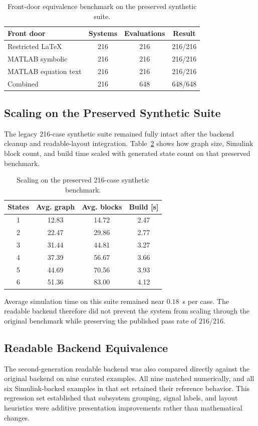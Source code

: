 \documentclass[colorlinks,upint,subscriptcorrection,varvw,balance,nofoot]{asmeconf}
\begin{document}
\begin{table}[t]
\caption{Front-door equivalence benchmark on the preserved synthetic suite.}
\label{tab:frontdoors}
\centering
\footnotesize
\begin{tabularx}{\columnwidth}{@{}l c c c@{}}
\toprule
Front door & Systems & Evaluations & Result \\
\midrule
Restricted \LaTeX{} & 216 & 216 & 216/216 \\
MATLAB symbolic & 216 & 216 & 216/216 \\
MATLAB equation text & 216 & 216 & 216/216 \\
\midrule
Combined & 216 & 648 & 648/648 \\
\bottomrule
\end{tabularx}
\end{table}

\subsection{Scaling on the Preserved Synthetic Suite}
The legacy 216-case synthetic suite remained fully intact after the backend cleanup and readable-layout integration. Table~\ref{tab:scaling} shows how graph size, Simulink block count, and build time scaled with generated state count on that preserved benchmark.

\begin{table}[t]
\caption{Scaling on the preserved 216-case synthetic benchmark.}
\label{tab:scaling}
\centering
\footnotesize
\begin{tabularx}{\columnwidth}{@{}c c c c@{}}
\toprule
States & Avg. graph & Avg. blocks & Build [s] \\
\midrule
1 & 12.83 & 14.72 & 2.47 \\
2 & 22.47 & 29.86 & 2.77 \\
3 & 31.44 & 44.81 & 3.27 \\
4 & 37.39 & 56.67 & 3.66 \\
5 & 44.69 & 70.56 & 3.93 \\
6 & 51.36 & 83.00 & 4.12 \\
\bottomrule
\end{tabularx}
\end{table}

Average simulation time on this suite remained near $0.18$~s per case. The readable backend therefore did not prevent the system from scaling through the original benchmark while preserving the published pass rate of 216/216.

\subsection{Readable Backend Equivalence}
The second-generation readable backend was also compared directly against the original backend on nine curated examples. All nine matched numerically, and all six Simulink-backed examples in that set retained their reference behavior. This regression set established that subsystem grouping, signal labels, and layout heuristics were additive presentation improvements rather than mathematical changes.
\end{document}
